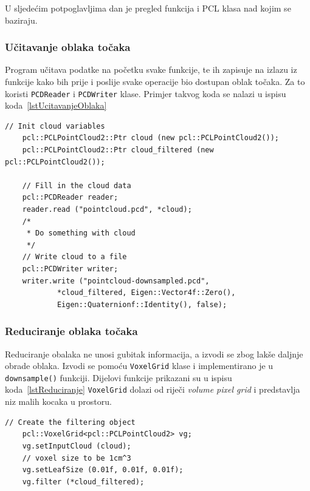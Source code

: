 U sljedećim potpoglavljima dan je pregled funkcija i PCL klasa nad kojim
se baziraju.

\subsubsection{Učitavanje oblaka točaka} %
\label{ssub:Učitavanje oblaka točaka}
Program učitava podatke na početku svake funkcije, te ih zapisuje na
izlazu iz funkcije kako bih prije i poslije svake operacije bio dostupan
oblak točaka. Za to koristi \texttt{PCDReader} i \texttt{PCDWriter} klase.
Primjer takvog koda se nalazi u ispisu koda~\ref{lstUcitavanjeOblaka}

\begin{lstlisting}[label=lstUcitavanjeOblaka, caption={Primjer izvornog
koda za učitavanje oblaka točaka}]
    // Init cloud variables 
    pcl::PCLPointCloud2::Ptr cloud (new pcl::PCLPointCloud2());
    pcl::PCLPointCloud2::Ptr cloud_filtered (new pcl::PCLPointCloud2());

    // Fill in the cloud data
    pcl::PCDReader reader;
    reader.read ("pointcloud.pcd", *cloud);
    /* 
     * Do something with cloud
     */
    // Write cloud to a file
    pcl::PCDWriter writer;
    writer.write ("pointcloud-downsampled.pcd",
            *cloud_filtered, Eigen::Vector4f::Zero(),
            Eigen::Quaternionf::Identity(), false);
\end{lstlisting}


\subsubsection{Reduciranje oblaka točaka} %
\label{ssub:Reduciranje oblaka točaka}
Reduciranje obalaka ne unosi gubitak informacija, a izvodi se zbog lakše
daljnje obrade oblaka. Izvodi se pomoću \texttt{VoxelGrid} klase i
implementirano je u \texttt{downsample()} funkciji. Dijelovi funkcije
prikazani su u ispisu koda~\ref{lstReduciranje}
\texttt{VoxelGrid} dolazi od riječi \textit{volume pixel grid} i
predstavlja niz malih kocaka u prostoru.

\begin{lstlisting}[label=lstReduciranje, caption={Dio izvornog koda za
reduciranje točaka iz funkcije \texttt{downsample()} }]
    // Create the filtering object
    pcl::VoxelGrid<pcl::PCLPointCloud2> vg;
    vg.setInputCloud (cloud);
    // voxel size to be 1cm^3
    vg.setLeafSize (0.01f, 0.01f, 0.01f);
    vg.filter (*cloud_filtered);
\end{lstlisting}

